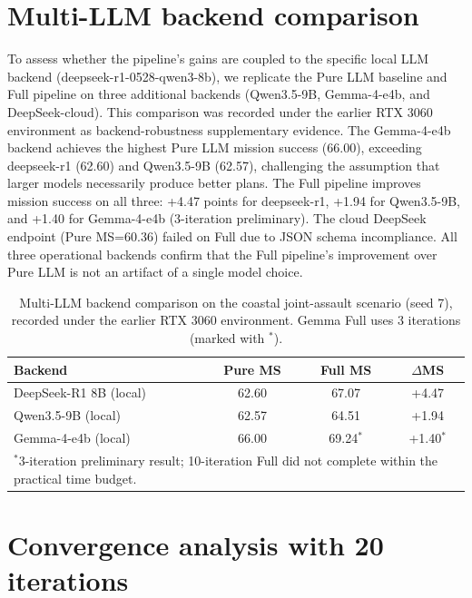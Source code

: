 
\section{Multi-LLM backend comparison}
\label{app:multillm}

To assess whether the pipeline's gains are coupled to the specific local LLM backend (deepseek-r1-0528-qwen3-8b), we replicate the Pure LLM baseline and Full pipeline on three additional backends (Qwen3.5-9B, Gemma-4-e4b, and DeepSeek-cloud). This comparison was recorded under the earlier RTX 3060 environment as backend-robustness supplementary evidence. The Gemma-4-e4b backend achieves the highest Pure LLM mission success (66.00), exceeding deepseek-r1 (62.60) and Qwen3.5-9B (62.57), challenging the assumption that larger models necessarily produce better plans. The Full pipeline improves mission success on all three: +4.47 points for deepseek-r1, +1.94 for Qwen3.5-9B, and +1.40 for Gemma-4-e4b (3-iteration preliminary). The cloud DeepSeek endpoint (Pure MS=60.36) failed on Full due to JSON schema incompliance. All three operational backends confirm that the Full pipeline's improvement over Pure LLM is not an artifact of a single model choice.

\begin{table}[ht]
\centering
\caption{Multi-LLM backend comparison on the coastal joint-assault scenario (seed 7), recorded under the earlier RTX 3060 environment. Gemma Full uses 3 iterations (marked with $^*$).}
\label{tab:multillm}
\small
\setlength{\tabcolsep}{5pt}
\begin{tabular}{lccc}
\toprule
Backend & Pure MS & Full MS & $\Delta$MS \\
\midrule
DeepSeek-R1 8B (local) & 62.60 & 67.07 & +4.47 \\
Qwen3.5-9B (local) & 62.57 & 64.51 & +1.94 \\
Gemma-4-e4b (local) & 66.00 & 69.24$^*$ & +1.40$^*$ \\
\bottomrule
\multicolumn{4}{p{0.9\textwidth}}{\footnotesize $^*$3-iteration preliminary result; 10-iteration Full did not complete within the practical time budget.}\\
\end{tabular}
\end{table}

\section{Convergence analysis with 20 iterations}
\label{app:convergence-20}

